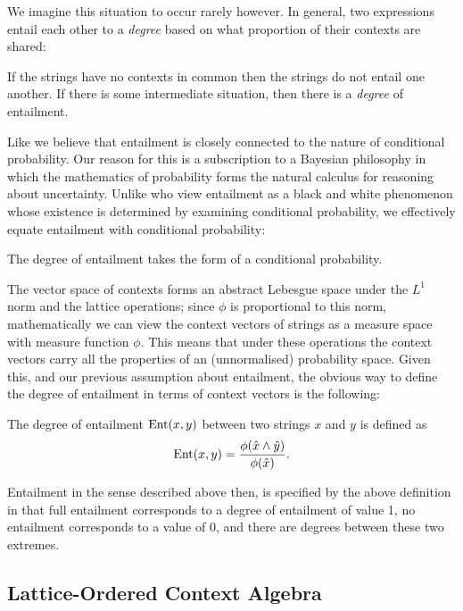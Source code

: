 \documentclass[11pt]{report}
\begin{document}
We imagine this situation to occur rarely however. In general, two expressions entail each other to a \emph{degree} based on what proportion of their contexts are shared: 
\begin{assumption}If the strings have no contexts in common then the strings do not entail one another. If there is some intermediate situation, then there is a \emph{degree} of entailment.\end{assumption}\noindent
Like \cite{Glickman:05} we believe that entailment is closely connected to the nature of conditional probability. Our reason for this is a subscription to a Bayesian philosophy in which the mathematics of probability forms the natural calculus for reasoning about uncertainty. Unlike \citeauthor{Glickman:05} who view entailment as a black and white phenomenon whose existence is determined by examining conditional probability, we effectively equate entailment with conditional probability:
\begin{assumption}
The degree of entailment takes the form of a conditional probability.
\end{assumption}
\noindent
The vector space of contexts forms an abstract Lebesgue space under the $L^1$ norm and the lattice operations; since $\phi$ is proportional to this norm, mathematically we can view the context vectors of strings as a measure space with measure function $\phi$. This means that under these operations the context vectors carry all the properties of an (unnormalised) probability space. Given this, and our previous assumption about entailment, the obvious way to define the degree of entailment in terms of context vectors is the following:
\begin{defn}
The degree of entailment $\operatorname{Ent}(x,y)$ between two strings $x$ and $y$ is defined as
$$\operatorname{Ent}(x,y) = \frac{\phi(\hat{x}\land\hat{y})}{\phi(\hat{x})}.$$
\end{defn}
Entailment in the sense described above then, is specified by the above definition in that full entailment corresponds to a degree of entailment of value 1, no entailment corresponds to a value of 0, and there are degrees between these two extremes.

\subsection{Lattice-Ordered Context Algebra}
\end{document}
